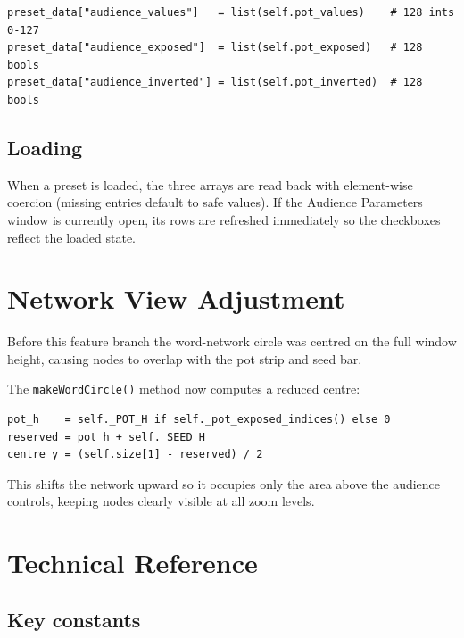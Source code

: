 \documentclass[11pt,a4paper]{report}
\begin{document}
\begin{lstlisting}[style=code]
preset_data["audience_values"]   = list(self.pot_values)    # 128 ints 0-127
preset_data["audience_exposed"]  = list(self.pot_exposed)   # 128 bools
preset_data["audience_inverted"] = list(self.pot_inverted)  # 128 bools
\end{lstlisting}

\section{Loading}

When a preset is loaded, the three arrays are read back with element-wise
coercion (missing entries default to safe values).  If the Audience
Parameters window is currently open, its rows are refreshed immediately so
the checkboxes reflect the loaded state.

\chapter{Network View Adjustment}

Before this feature branch the word-network circle was centred on the full
window height, causing nodes to overlap with the pot strip and seed bar.

The \texttt{makeWordCircle()} method now computes a reduced centre:

\begin{lstlisting}[style=code]
pot_h    = self._POT_H if self._pot_exposed_indices() else 0
reserved = pot_h + self._SEED_H
centre_y = (self.size[1] - reserved) / 2
\end{lstlisting}

This shifts the network upward so it occupies only the area above the
audience controls, keeping nodes clearly visible at all zoom levels.

\chapter{Technical Reference}

\section{Key constants}
\end{document}
